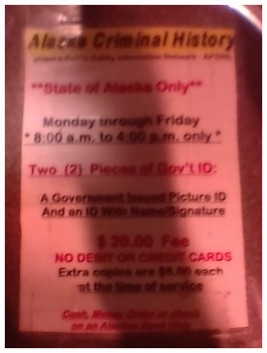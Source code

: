\documentclass[letterpaper]{article}
\begin{document}
\begin{figure}
\noindent\begin{minipage}{0.45\textwidth}\centering
	\includegraphics[width=1.0\textwidth]{images/IMG_20171206_151214.jpg}
	\end{minipage}\textwidth\begin{minipage}{0.45\textwidth}\centering

\end{minipage}
\end{figure}
\end{document}
